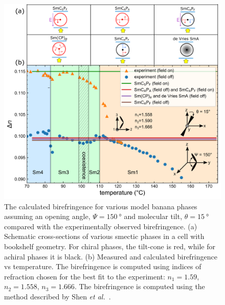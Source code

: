 \documentclass[superscriptaddress,floatfix,onecolumn,notitlepage]{revtex4-1}
\begin{document}
\begin{figure}[H]
    \centering
\includegraphics[width=1\linewidth]{theory-biref.png}
    \caption{\label{fig:calbif} The calculated birefringence for various model
        banana phases assuming
        an opening angle, $\Psi = \SI{150}{\degree}$ and molecular tilt, $\theta
        = \SI{15}{\degree}$ compared with the experimentally observed birefringence. (a) Schematic cross-sections of various smectic phases in a cell with bookshelf geometry. For
    chiral phases, the tilt-cone is red, while for achiral phases it is black.
    (b) Measured and calculated birefringence vs temperature. The birefringence
    is computed using indices of refraction chosen for the best fit to the
    experiment: $n_1=1.59$, $n_2=1.558$, $n_3=1.666$.
    The birefringence is computed using the method described by
Shen \textit{et al.}~\cite{shen2013generalized}.}
\end{figure}
%
\end{document}

